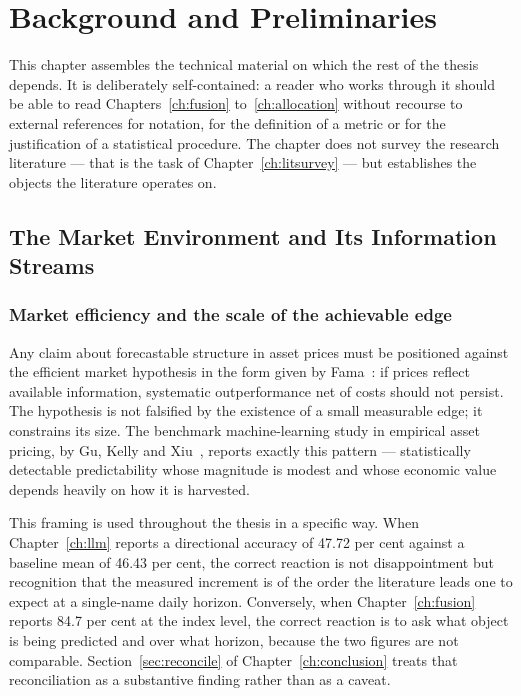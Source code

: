 \chapter{Background and Preliminaries}
\label{ch:background}

This chapter assembles the technical material on which the rest of the thesis depends. It is
deliberately self-contained: a reader who works through it should be able to read
Chapters~\ref{ch:fusion} to~\ref{ch:allocation} without recourse to external references for
notation, for the definition of a metric or for the justification of a statistical procedure.
The chapter does not survey the research literature --- that is the task of
Chapter~\ref{ch:litsurvey} --- but establishes the objects the literature operates on.

\section{The Market Environment and Its Information Streams}

\subsection{Market efficiency and the scale of the achievable edge}

Any claim about forecastable structure in asset prices must be positioned against the
efficient market hypothesis in the form given by Fama~\cite{fama1970}: if prices reflect
available information, systematic outperformance net of costs should not persist. The
hypothesis is not falsified by the existence of a small measurable edge; it constrains its
size. The benchmark machine-learning study in empirical asset pricing, by Gu, Kelly and
Xiu~\cite{gu2020}, reports exactly this pattern --- statistically detectable predictability
whose magnitude is modest and whose economic value depends heavily on how it is harvested.

This framing is used throughout the thesis in a specific way. When Chapter~\ref{ch:llm}
reports a directional accuracy of 47.72 per cent against a baseline mean of 46.43 per cent,
the correct reaction is not disappointment but recognition that the measured increment is of
the order the literature leads one to expect at a single-name daily horizon. Conversely, when
Chapter~\ref{ch:fusion} reports 84.7 per cent at the index level, the correct reaction is to
ask what object is being predicted and over what horizon, because the two figures are not
comparable. Section~\ref{sec:reconcile} of Chapter~\ref{ch:conclusion} treats that
reconciliation as a substantive finding rather than as a caveat.

